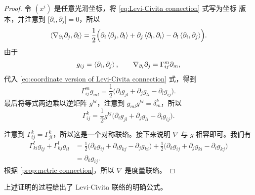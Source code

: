 \begin{proof}
  令 $(x^i)$ 是任意光滑坐标，将 \eqref{eq:Levi-Civita connection} 式写为坐标
  版本，并注意到 $\bigl[\partial_i,\partial_j\bigr]=0$，所以
  \begin{equation}\label{eq:coordinate version of Levi-Civita connection}
    \left\langle \nabla_{\partial_i}\partial_j,\partial_l\right\rangle=
    \frac{1}{2}\Bigl(\partial_i\left\langle \partial_j,\partial_l\right\rangle
    +\partial_j\left\langle \partial_l,\partial_i\right\rangle-\partial_l\left\langle \partial_i,\partial_j\right\rangle\Bigr).  
  \end{equation}
  由于
  \[
    g_{ij}=\left\langle \partial_i,\partial_j\right\rangle, \qquad \nabla_{\partial_i}\partial_j=\Gamma_{ij}^m  \partial_m,
  \]
  代入 \eqref{eq:coordinate version of Levi-Civita connection} 式，得到
  \begin{equation}
    \Gamma_{ij}^m g_{ml}=\frac{1}{2}\bigl(\partial_i g_{jl}+\partial_j g_{li}-\partial_l g_{ij}\bigr).
  \end{equation}
  最后将等式两边乘以逆矩阵 $g^{kl}$，注意到 $g_{ml}g^{kl}=\delta^k_m$，所以
  \begin{equation}
    \Gamma_{ij}^k=\frac{1}{2}g^{kl}\bigl(\partial_i g_{jl}+\partial_j g_{li}-\partial_l g_{ij}\bigr).
  \end{equation}

  注意到 $\Gamma_{ij}^k=\Gamma_{ji}^k$，所以这是一个对称联络。接下来说明
  $\nabla$ 与 $g$ 相容即可。我们有
  \begin{align*}
    \Gamma_{ki}^lg_{lj}+\Gamma_{kj}^lg_{il}&=\frac{1}{2}
    \bigl(\partial_kg_{ij}+\partial_ig_{kj}-\partial_jg_{ki}\bigr)
    +\frac{1}{2}
    \bigl(\partial_kg_{ij}+\partial_jg_{ki}-\partial_ig_{kj}\bigr)\\
    &=\partial_k g_{ij}.
  \end{align*}
  根据 \autoref{prop:metric connection}，所以 $\nabla$ 是度量联络。
\end{proof}

上述证明的过程给出了 Levi-Civita 联络的明确公式。

